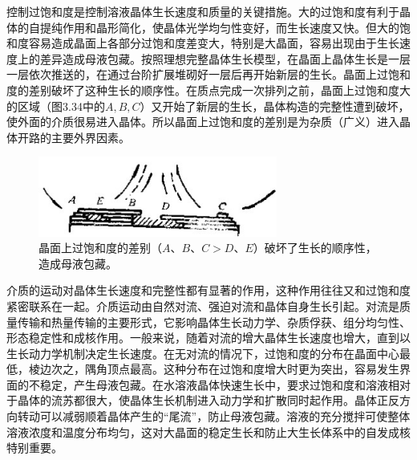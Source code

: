 控制过饱和度是控制溶液晶体生长速度和质量的关键措施。大的过饱和度有利于晶体的自提纯作用和晶形简化，使晶体光学均匀性变好，而生长速度又快。但大的饱和度容易造成晶面上各部分过饱和度差变大，特别是大晶面，容易出现由于生长速度上的差异造成母液包藏。按照理想完整晶体生长模型，在晶面上晶体生长是一层一层依次推送的，在通过台阶扩展堆砌好一层后再开始新层的生长。晶面上过饱和度的差别破坏了这种生长的顺序性。在质点完成一次排列之前，晶面上过饱和度大的区域（图3.34中的$A, B, C$）又开始了新层的生长，晶体构造的完整性遭到破坏，使外面的介质很易进入晶体。所以晶面上过饱和度的差别是为杂质（广义）进入晶体开路的主要外界因素。

\begin{figure}[htbp]
 \centering
 \includegraphics[width=0.7\textwidth]{fig/cp03/img3.34.jpg}
 \caption{晶面上过饱和度的差别（$A$、$B$、$C>D$、$E$）破坏了生长的顺序性，造成母液包藏。}
\end{figure}

介质的运动对晶体生长速度和完整性都有显著的作用，这种作用往往又和过饱和度紧密联系在一起。介质运动由自然对流、强迫对流和晶体自身生长引起。对流是质量传输和热量传输的主要形式，它影响晶体生长动力学、杂质俘获、组分均匀性、形态稳定性和成核作用。一般来说，随着对流的增大晶体生长速度也增大，直到以生长动力学机制决定生长速度。在无对流的情况下，过饱和度的分布在晶面中心最低，棱边次之，隅角顶点最高。这种分布在过饱和度增大时更为突出，容易发生界面的不稳定，产生母液包藏。在水溶液晶体快速生长中，要求过饱和度和溶液相对于晶体的流苏都很大，使晶体生长机制进入动力学和扩散同时起作用。晶体正反方向转动可以减弱顺着晶体产生的“尾流”，防止母液包藏。溶液的充分搅拌可使整体溶液浓度和温度分布均匀，这对大晶面的稳定生长和防止大生长体系中的自发成核特别重要。
